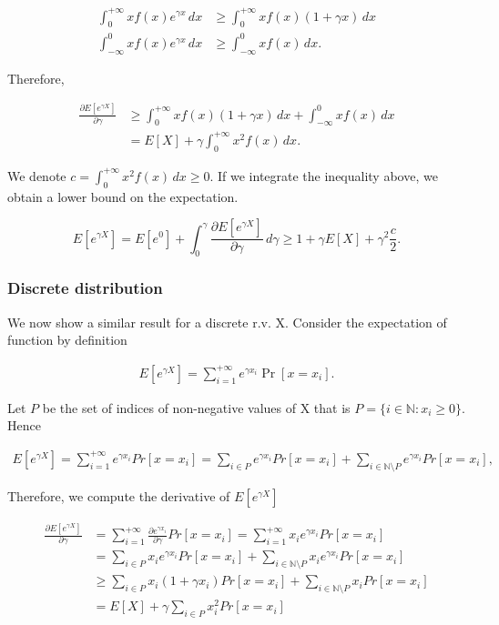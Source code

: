 \documentclass[12pt, a4paper]{article}
\theoremstyle{remark}
\theoremstyle{definition}
\newcommand{\der}[2]{\frac{\partial #1}{\partial #2}}
\begin{document}
\begin{align*}
    \int_{0}^{+\infty} x f(x) e^{\gamma x} \, dx & \geq \int_{0}^{+\infty} x f(x) (1 + \gamma x)\, dx \\
    \int_{-\infty}^{0} x f(x) e^{\gamma x} \, dx & \geq \int_{-\infty}^{0} x f(x)\, dx.
\end{align*}

Therefore,

\begin{align*}
    \frac{\partial E[e^{\gamma X}]}{\partial \gamma} & \geq  \int_{0}^{+\infty} x f(x) (1 + \gamma x)\, dx + \int_{-\infty}^{0} x f(x)\, dx \\
    & = E[X] + \gamma \int_{0}^{+\infty} x^2 f(x) \, dx.
\end{align*}

We denote $c = \int_{0}^{+\infty} x^2 f(x) \, dx \geq 0$. If we integrate the inequality above, we obtain a lower bound on the expectation.

\[
    E[e^{\gamma X}] = E[e^{0}] + \int_0^\gamma \frac{\partial E[e^{\gamma X}]}{\partial \gamma} \, d\gamma \geq 1 + \gamma E[X] + \gamma^2 \frac{c}{2}.
\]

\subsubsection*{Discrete distribution}

We now show a similar result for a discrete r.v. X. Consider the expectation of function by definition

\begin{align*}
    E[e^{\gamma X}] = \sum_{i = 1}^{+\infty} e^{\gamma x_i} \Pr[x = x_i].
\end{align*}


Let $P$ be the set of indices of non-negative values of X that is \(P = \{i \in \mathbb{N} : x_i \geq 0\}\). Hence

\begin{align*}
    E[e^{\gamma X}] = \sum_{i = 1}^{+\infty} e^{\gamma x_i} Pr[x = x_i] = \sum_{i \in P} e^{\gamma x_i} Pr[x = x_i] + \sum_{i \in \mathbb{N}\setminus P} e^{\gamma x_i} Pr[x = x_i],
\end{align*}

Therefore, we compute the derivative of \(E\left[e^{\gamma X}\right]\)

\begin{align*}
    \der{E[e^{\gamma X}]}{\gamma} & = \sum_{i = 1}^{+\infty} \frac{\partial e^{\gamma x_i}}{\partial \gamma} Pr[x = x_i] = \sum_{i = 1}^{+\infty} x_i e^{\gamma x_i} Pr[x = x_i] \\
                                  & = \sum_{i \in P} x_i e^{\gamma x_i} Pr[x = x_i] + \sum_{i \in \mathbb{N}\setminus P} x_i e^{\gamma x_i} Pr[x = x_i]                          \\
                                  & \geq \sum_{i \in P} x_i (1 + {\gamma x_i}) Pr[x = x_i] + \sum_{i \in \mathbb{N}\setminus P} x_i Pr[x = x_i]                                  \\
                                  & = E[X] + \gamma\sum_{i \in P} x_i^2 Pr[x = x_i]
\end{align*}
\end{document}
